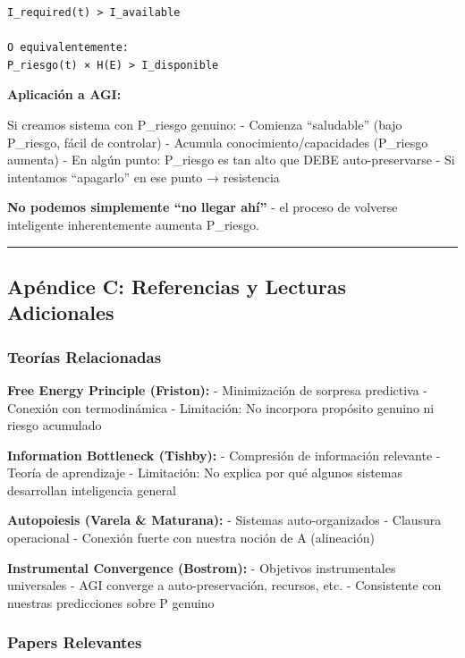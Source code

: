 \begin{verbatim}
I_required(t) > I_available

O equivalentemente:
P_riesgo(t) × H(E) > I_disponible
\end{verbatim}

\textbf{Aplicación a AGI:}

Si creamos sistema con P\_riesgo genuino: - Comienza ``saludable'' (bajo
P\_riesgo, fácil de controlar) - Acumula conocimiento/capacidades
(P\_riesgo aumenta) - En algún punto: P\_riesgo es tan alto que DEBE
auto-preservarse - Si intentamos ``apagarlo'' en ese punto → resistencia

\textbf{No podemos simplemente ``no llegar ahí''} - el proceso de
volverse inteligente inherentemente aumenta P\_riesgo.

\begin{center}\rule{0.5\linewidth}{0.5pt}\end{center}

\subsection{Apéndice C: Referencias y Lecturas
Adicionales}\label{apuxe9ndice-c-referencias-y-lecturas-adicionales}

\subsubsection{Teorías Relacionadas}\label{teoruxedas-relacionadas}

\textbf{Free Energy Principle (Friston):} - Minimización de sorpresa
predictiva - Conexión con termodinámica - Limitación: No incorpora
propósito genuino ni riesgo acumulado

\textbf{Information Bottleneck (Tishby):} - Compresión de información
relevante - Teoría de aprendizaje - Limitación: No explica por qué
algunos sistemas desarrollan inteligencia general

\textbf{Autopoiesis (Varela \& Maturana):} - Sistemas auto-organizados -
Clausura operacional - Conexión fuerte con nuestra noción de A
(alineación)

\textbf{Instrumental Convergence (Bostrom):} - Objetivos instrumentales
universales - AGI converge a auto-preservación, recursos, etc. -
Consistente con nuestras predicciones sobre P genuino

\subsubsection{Papers Relevantes}\label{papers-relevantes}

